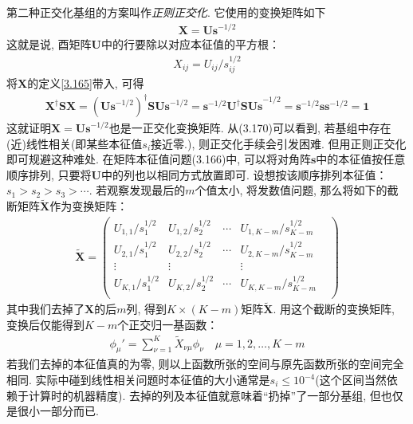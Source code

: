 第二种正交化基组的方案叫作\emph{正则正交化}. 它使用的变换矩阵如下
\begin{align}
\mathbf{X=Us}^{-1/2}
\end{align}
这就是说, 酉矩阵$\mathbf{U}$中的行要除以对应本征值的平方根：
\begin{align}
X_{ij} = U_{ij}/s_{ij}^{1/2}
\end{align}
将$\mathbf{X}$的定义\eqref{3.165}带入, 可得
\begin{align}
\mathbf{X^\dagger SX} = (\mathbf{Us}^{-1/2})^\dagger\mathbf{SUs}^{-1/2} = \mathbf{s}^{-1/2}\mathbf{U^\dagger SUs}^{-1/2} = \mathbf{s}^{-1/2}\mathbf{ss}^{-1/2}=\mathbf{1}
\end{align}
这就证明$\mathbf{X=Us}^{-1/2}$也是一正交化变换矩阵. 从(3.170)可以看到, 若基组中存在(近)线性相关(即某些本征值$s_i$接近零.), 则正交化手续会引发困难. 但用正则正交化即可规避这种难处. 在矩阵本征值问题(3.166)中, 可以将对角阵$\mathbf{s}$中的本征值按任意顺序排列, 只要将$\mathbf{U}$中的列也以相同方式放置即可. 设想按该顺序排列本征值：$s_1>s_2>s_3>\cdots$. 若观察发现最后的$m$个值太小, 将发数值问题, 那么将如下的截断矩阵$\mathbf{\tilde{X}}$作为变换矩阵：
\begin{align}
\tilde{\mathbf{X}} =
\begin{pmatrix}
U_{1,1}/s^{1/2}_{1} & U_{1,2}/s^{1/2}_{2} & \cdots & U_{1,K-m}/s^{1/2}_{K-m} &\\
U_{2,1}/s^{1/2}_{1} & U_{2,2}/s^{1/2}_{2} & \cdots & U_{2,K-m}/s^{1/2}_{K-m} &\\
\vdots              & \vdots              &        & \vdots                  &\\
U_{K,1}/s^{1/2}_{1} & U_{K,2}/s^{1/2}_{2} & \cdots & U_{K,K-m}/s^{1/2}_{K-m} &\\
\end{pmatrix}
\end{align}
其中我们去掉了$\mathbf{X}$的后$m$列, 得到$K\times (K-m)$矩阵$\tilde{\mathbf{X}}$. 用这个截断的变换矩阵, 变换后仅能得到$K-m$个正交归一基函数：
\begin{align}
\phi_\mu' = \sum_{\nu=1}^{K}\tilde{X}_{\nu\mu}\phi_\nu\quad\mu=1,2,\ldots,K-m
\end{align}
若我们去掉的本征值真的为零, 则以上函数所张的空间与原先函数所张的空间完全相同. 实际中碰到线性相关问题时本征值的大小通常是$s_i\leqslant 10^{-4}$(这个区间当然依赖于计算时的机器精度). 去掉的列及本征值就意味着``扔掉''了一部分基组, 但也仅是很小一部分而已.

